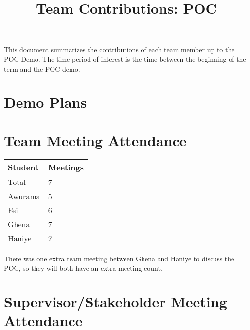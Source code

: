 \documentclass{article}
\title{Team Contributions: POC\\\progname}
\author{\authname}
\date{}
\begin{document}
\maketitle

This document summarizes the contributions of each team member up to the POC
Demo.  The time period of interest is the time between the beginning of the term
and the POC demo.

\section{Demo Plans}


\section{Team Meeting Attendance}


\begin{table}[H]
\centering
\begin{tabular}{ll}
\toprule
\textbf{Student} & \textbf{Meetings}\\
\midrule
Total & 7\\
Awurama & 5\\
Fei & 6\\
Ghena & 7\\
Haniye & 7\\
\bottomrule
\end{tabular}
\end{table}

There was one extra team meeting between Ghena and Haniye to discuss the POC, so they will both have an extra meeting count.
\section{Supervisor/Stakeholder Meeting Attendance}

\end{document}
